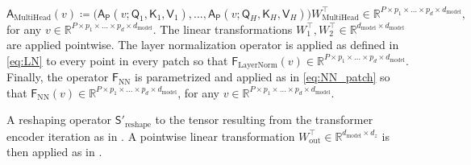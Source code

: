 \documentclass[twoside]{article}
\newcommand{\1}{\mathbbm{1}}
\newcommand{\R}{\mathbbm{R}}
\newcommand{\sA}{\mathsf{A}}
\newcommand{\sAp}{\mathsf{A}_{\mathsf{P}}}
\newcommand{\sQ}{\mathsf{Q}}
\newcommand{\sK}{\mathsf{K}}
\newcommand{\sF}{\mathsf{F}}
\newcommand{\sS}{\mathsf{S}}
\newcommand{\sV}{\mathsf{V}}
\providecommand{\mathbbm}{\mathbb} %
\begin{document}
\begin{equation}
\label{eq:multihead_implement_operator1}
    \sA_{\textrm{MultiHead}}(v) \coloneqq  \bigl(\sAp(v;\sQ_1,\sK_1,\sV_1),\ldots, \sAp(v;\sQ_H,\sK_H,\sV_H)  \bigr) W_{\textrm{MultiHead}}^\top \in \R^{P\times p_1\times \ldots\times p_d\times d_{\textrm{model}}},
\end{equation}
for any $v\in \R^{P\times p_1\times \ldots\times p_d\times d_{\textrm{model}}}$. The linear transformations $W_1^\top,W_2^\top\in\R^{d_{\textrm{model}}\times d_{\textrm{model}}}$ are applied pointwise. The layer normalization operator is applied as defined in \eqref{eq:LN} to every point in every patch so that $\sF_{\textrm{LayerNorm}}(v)\in \R^{P\times p_1 \times \ldots \times p_d \times d_{\textrm{model}}} $. Finally, the operator $\sF_{\textrm{NN}}$ is parametrized and applied as in \eqref{eq:NN_patch} so that $\sF_{\textrm{NN}}(v)\in \R^{P\times p_1 \times \ldots \times p_d \times d_{\textrm{model}}}$, for any $v\in \R^{P\times p_1 \times \ldots \times p_d \times d_{\textrm{model}}}$.

A reshaping operator $\sS'_{\textrm{reshape}}$ to the tensor resulting from the transformer encoder iteration as in . A pointwise linear transformation $W_{\textrm{out}}^\top\in \R^{ d_{\textrm{model}}\times d_z}$ is then applied as in . 
\end{document}
